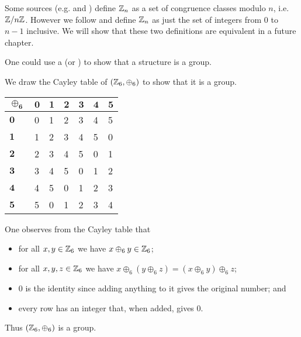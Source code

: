 \begin{remark}
    Some sources (e.g. {\cite[\S 33]{clark_1984}} and {\cite[Proposition 2.31]{humphreys_1996}}) define $\mathbb{Z}_n$ as a set of congruence classes modulo $n$, i.e. $\mathbb{Z}/n\mathbb{Z}$. However we follow \cite[p.~42]{gallian_2016} and define $\mathbb{Z}_n$ as just the set of integers from 0 to $n - 1$ inclusive. We will show that these two definitions are equivalent in a future chapter.
\end{remark}

One could use a  (or ) to show that a structure is a group.
\begin{example}
    We draw the Cayley table of $(\mathbb{Z}_6, \oplus_6)$ to show that it is a group.
    \begin{table}[h]
        \centering
        \begin{tabular}{|l|l|l|l|l|l|l|}
        \hline
        $\boldsymbol{\oplus_6}$ & $\boldsymbol{0}$ & $\boldsymbol{1}$ & $\boldsymbol{2}$ & $\boldsymbol{3}$ & $\boldsymbol{4}$ & $\boldsymbol{5}$ \\ \hline
        $\boldsymbol{0}$ & 0 & 1 & 2 & 3 & 4 & 5 \\ \hline
        $\boldsymbol{1}$ & 1 & 2 & 3 & 4 & 5 & 0 \\ \hline
        $\boldsymbol{2}$ & 2 & 3 & 4 & 5 & 0 & 1 \\ \hline
        $\boldsymbol{3}$ & 3 & 4 & 5 & 0 & 1 & 2 \\ \hline
        $\boldsymbol{4}$ & 4 & 5 & 0 & 1 & 2 & 3 \\ \hline
        $\boldsymbol{5}$ & 5 & 0 & 1 & 2 & 3 & 4 \\ \hline
        \end{tabular}
    \end{table}

    One observes from the Cayley table that
    \begin{itemize}
        \item for all $x, y \in \mathbb{Z}_6$ we have $x \oplus_6 y \in \mathbb{Z}_6$;
        \item for all $x, y, z \in \mathbb{Z}_6$ we have $x \oplus_6 (y \oplus_6 z) = (x \oplus_6 y) \oplus_6 z$;
        \item 0 is the identity since adding anything to it gives the original number; and
        \item every row has an integer that, when added, gives 0.
    \end{itemize}
    Thus $(\mathbb{Z}_6, \oplus_6)$ is a group.
\end{example}

